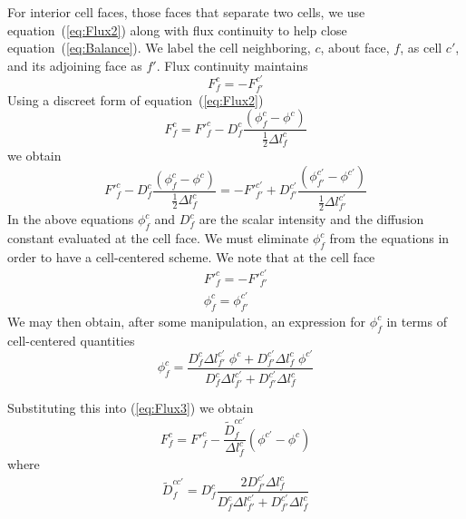 \documentclass{article}
\begin{document}
For interior cell faces, those faces that separate two cells, we use
equation~(\ref{eq:Flux2}) along with flux continuity to help close
equation~(\ref{eq:Balance}).
We label the cell neighboring, $c$, about face, $f$, as cell $c'$, and its
adjoining face as $f'$.
Flux continuity maintains
\begin{equation}
	F^{c}_{f} = - F^{c'}_{f'}
\end{equation}
Using a discreet form of equation~(\ref{eq:Flux2})
\begin{equation}
        F^{c}_{f} = 
	{F'}^{c}_{f} - D^{c}_{f} \frac{(\phi^{c}_{f} - \phi^{c})}
				      {\frac{1}{2}\Delta l^{c}_{f}}
\label{eq:Flux3}
\end{equation}
we obtain
\begin{equation}
	{F'}^{c}_{f} - D^{c}_{f} \frac{(\phi^{c}_{f} - \phi^{c})}
				    {\frac{1}{2}\Delta l^{c}_{f}}
    = - {F'}^{c'}_{f'} + D^{c'}_{f'} \frac{(\phi^{c'}_{f'} - \phi^{c'})}
				        {\frac{1}{2}\Delta l^{c'}_{f'}}
\end{equation}
In the above equations $\phi^{c}_{f}$ and $D^{c}_{f}$
are the scalar intensity and the diffusion constant evaluated
at the cell face.
We must eliminate $\phi^{c}_{f}$ from the equations in order to have a
cell-centered scheme.
We note that at the cell face
\begin{gather}
	{F'}^{c}_{f} = - {F'}^{c'}_{f'} \\
	\phi^{c}_{f} = \phi^{c'}_{f'}
\end{gather}
We may then obtain, after some manipulation,
an expression for $\phi^{c}_{f}$ in terms of cell-centered
quantities
\begin{equation}
	\phi^{c}_{f} =  \frac
			{ D^{c}_{f} \Delta l^{c'}_{f'} \; \phi^{c} 
			    + D^{c'}_{f'} \Delta l^{c}_{f} \; \phi^{c'} 
			}
			{ D^{c}_{f} \Delta l^{c'}_{f'}
			    + D^{c'}_{f'} \Delta l^{c}_{f}
			}
\label{eq:phicf}
\end{equation}

Substituting this into (\ref{eq:Flux3}) we obtain
\begin{equation}
        F^{c}_{f} = 
	{F'}^{c}_{f} -  \frac{\tilde{D}^{cc'}_{f}}{\Delta l^{c}_{f}}
			\left( \phi^{c'} - \phi^{c} \right)
\label{eq:Finterior}
\end{equation}
where
\begin{equation}
    \boxed{
	\tilde{D}^{cc'}_{f} =
                       D^{c}_{f}
                       \frac{
			 2 D^{c'}_{f'} \Delta l^{c}_{f}
                       }
                       {
			   D^{c}_{f}   \Delta l^{c'}_{f'}
			+  D^{c'}_{f'} \Delta l^{c}_{f}
		       }
     }
\end{equation}
\end{document}

